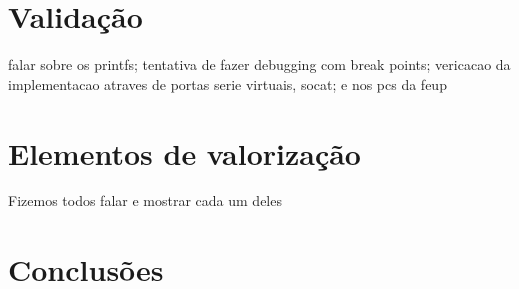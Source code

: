 \documentclass[a4paper]{article}
\begin{document}
\section{Validação}
falar sobre os printfs; tentativa de fazer debugging com break points;
vericacao da implementacao atraves de portas serie virtuais, socat; e nos pcs
da feup

\section{Elementos de valorização}
Fizemos todos falar e mostrar cada um deles

\section{Conclusões}
\end{document}
